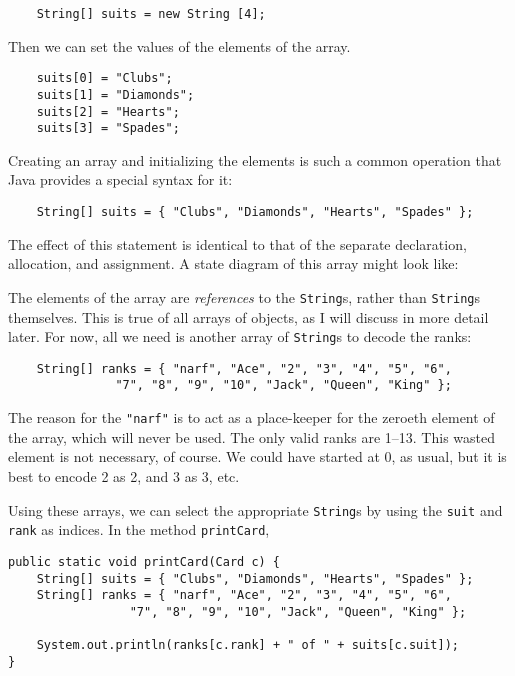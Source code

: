 \documentclass{book}
\newcommand{\beforefig}{\vspace{1.3\parskip}}
\newcommand{\afterfig}{\vspace{-0.2\parskip}}
\newcommand{\myfig}[1]{
    \beforefig
    \centerline{\epsfig{#1,scale=0.8}}
    \afterfig
}
\begin{document}
\begin{verbatim}
    String[] suits = new String [4];
\end{verbatim}
%
Then we can set the values of the elements of the array.

\begin{verbatim}
    suits[0] = "Clubs";
    suits[1] = "Diamonds";
    suits[2] = "Hearts";
    suits[3] = "Spades";
\end{verbatim}
%
Creating an array and initializing the elements is such a common
operation that Java provides a special syntax for it:

\begin{verbatim}
    String[] suits = { "Clubs", "Diamonds", "Hearts", "Spades" };
\end{verbatim}
%
The effect of this statement is identical to that of the
separate declaration, allocation, and assignment.  A state
diagram of this array might look like:

\myfig{figure=figs/stringarray.eps}


The elements of the array are {\em references} to the {\tt String}s,
rather than {\tt String}s themselves.  This is true of all arrays of
objects, as I will discuss in more detail later.  For now, all we need
is another array of {\tt String}s to decode the ranks:

\begin{verbatim}
    String[] ranks = { "narf", "Ace", "2", "3", "4", "5", "6",
               "7", "8", "9", "10", "Jack", "Queen", "King" };
\end{verbatim}
%
The reason for the {\tt "narf"} is to act as a place-keeper
for the zeroeth element of the array, which will never be
used.  The only valid ranks are 1--13.  This wasted element is not
necessary, of course.  We could have started at 0, as usual, but
it is best to encode 2 as 2, and 3 as 3, etc.

Using these arrays, we can select the appropriate {\tt String}s by
using the {\tt suit} and {\tt rank} as indices.  In the method
{\tt printCard},

\begin{verbatim}
public static void printCard(Card c) {
    String[] suits = { "Clubs", "Diamonds", "Hearts", "Spades" };
    String[] ranks = { "narf", "Ace", "2", "3", "4", "5", "6",
                 "7", "8", "9", "10", "Jack", "Queen", "King" };

    System.out.println(ranks[c.rank] + " of " + suits[c.suit]);
}
\end{verbatim}
\end{document}
